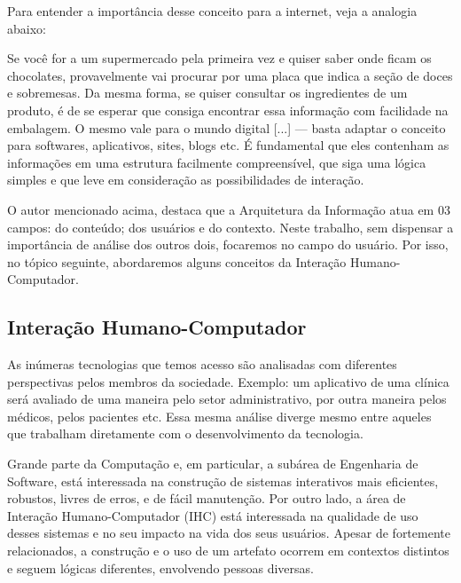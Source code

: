 \documentclass[12pt]{article}
\begin{document}
Para entender a importância desse conceito para a internet, veja a analogia abaixo:
\begin{quoting}[rightmargin=0cm,leftmargin=4cm]
{\footnotesize 
Se você for a um supermercado pela primeira vez e quiser saber onde ficam os chocolates, provavelmente vai procurar por uma placa que indica a seção de doces e sobremesas. Da mesma forma, se quiser consultar os ingredientes de um produto, é de se esperar que consiga encontrar essa informação com facilidade na embalagem.
O mesmo vale para o mundo digital [...] — basta adaptar o conceito para softwares, aplicativos, sites, blogs etc.
É fundamental que eles contenham as informações em uma estrutura facilmente compreensível, que siga uma lógica simples e que leve em consideração as possibilidades de interação. \cite{xavier_arquitetura}}
\end{quoting}

O autor mencionado acima, destaca que a Arquitetura da Informação atua em 03 campos: do conteúdo; dos usuários e do contexto. Neste trabalho, sem dispensar a importância de análise dos outros dois, focaremos no campo do usuário. Por isso, no tópico seguinte, abordaremos alguns conceitos da Interação Humano-Computador.

\subsection{Interação Humano-Computador}
As inúmeras tecnologias que temos acesso são analisadas com diferentes perspectivas pelos membros da sociedade. Exemplo: um aplicativo de uma clínica será avaliado de uma maneira pelo setor administrativo, por outra maneira pelos médicos, pelos pacientes etc.
Essa mesma análise diverge mesmo entre aqueles que trabalham diretamente com o desenvolvimento da tecnologia.
\begin{quoting}[rightmargin=0cm,leftmargin=4cm]
{\footnotesize 
Grande parte da Computação e, em particular, a subárea de Engenharia de Software, está interessada na construção de sistemas interativos mais eficientes, robustos, livres de erros, e de fácil manutenção. Por outro lado, a área de Interação Humano-Computador (IHC) está interessada na qualidade de uso desses sistemas e no seu impacto na vida dos seus usuários. Apesar de fortemente relacionados, a construção e o uso de um artefato ocorrem em contextos distintos e seguem lógicas diferentes, envolvendo pessoas diversas. \cite[p. ~29-30]{barbosa}}
\end{quoting}
\end{document}
